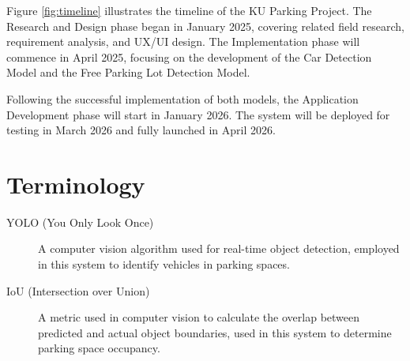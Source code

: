 Figure \ref{fig:timeline} illustrates the timeline of the KU Parking Project. The Research and Design phase began in January 2025, covering related field research, requirement analysis, and UX/UI design. The Implementation phase will commence in April 2025, focusing on the development of the Car Detection Model and the Free Parking Lot Detection Model.

Following the successful implementation of both models, the Application Development phase will start in January 2026. The system will be deployed for testing in March 2026 and fully launched in April 2026.

\section{Terminology}
\label{section:terminology}

\begin{description} 
    \item[YOLO (You Only Look Once)] A computer vision algorithm used for real-time object detection, employed in this system to identify vehicles in parking spaces.

    \item[IoU (Intersection over Union)] A metric used in computer vision to calculate the overlap between predicted and actual object boundaries, used in this system to determine parking space occupancy.   
\end{description}